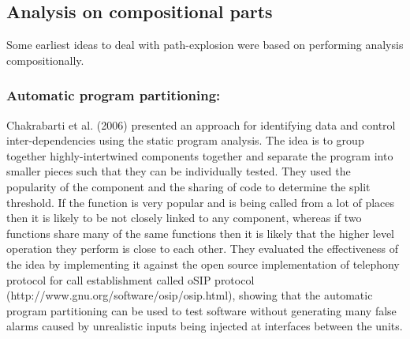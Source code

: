 \documentclass[ runningheads,
               a4paper]{llncs}
\begin{document}


\subsection{Analysis on compositional parts}
Some earliest ideas to deal with path-explosion were based on performing analysis compositionally.


\subsubsection{Automatic program partitioning:}
Chakrabarti et al. (2006) \cite{chakrabarti2006software} presented an approach for identifying data and control inter-dependencies using the static program analysis. The idea is to group together highly-intertwined components together and separate the program into smaller pieces such that they can be individually tested. They used the popularity of the component and the sharing of code to determine the split threshold. If the function is very popular and is being called from a lot of places then it is likely to be not closely linked to any component, whereas if two functions share many of the same functions then it is likely that the higher level operation they perform is close to each other. They evaluated the effectiveness of the idea by implementing it against the open source implementation of telephony protocol for call establishment called oSIP protocol (http://www.gnu.org/software/osip/osip.html), showing that the automatic program partitioning can be used to test software without generating many false alarms caused by unrealistic inputs being injected at interfaces between the units.
\end{document}
